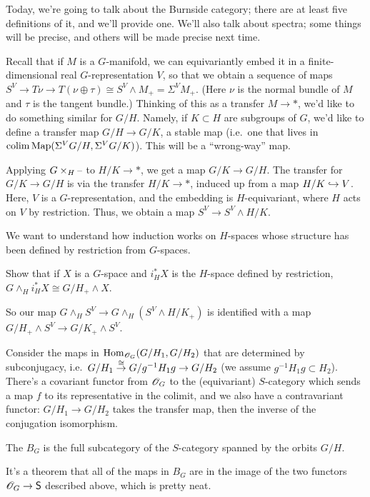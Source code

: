 Today, we're going to talk about the Burnside category; there are at least five definitions of it, and we'll
provide one. We'll also talk about spectra; some things will be precise, and others will be made precise next time.

Recall that if $M$ is a $G$-manifold, we can equivariantly embed it in a finite-dimensional real $G$-representation
$V$, so that we obtain a sequence of maps $S^V\to T\!\nu\to T(\nu\oplus\tau)\cong S^V\wedge M_+ = \Sigma^V M_+$.
(Here $\nu$ is the normal bundle of $M$ and $\tau$ is the tangent bundle.) Thinking of this as a transfer $M\to *$,
we'd like to do something similar for $G/H$. Namely, if $K\subset H$ are subgroups of $G$, we'd like to define a
transfer map $G/H\to G/K$, a stable map (i.e.\ one that lives in $\operatorname*{colim}\operatorname{Map}(\Sigma^V G/H, \Sigma^V G/K)$). This
will be a ``wrong-way'' map.

Applying $G\times_H\text{--}$ to $H/K\to *$, we get a map $G/K\to G/H$. The transfer for $G/K\to G/H$ is via the transfer
$H/K\to *$, induced up from a map $H/K\hookrightarrow V$. Here, $V$ is a $G$-representation, and the embedding is
$H$-equivariant, where $H$ acts on $V$ by restriction. Thus, we obtain a map $S^V\to S^V\wedge H/K$.

We want to understand how induction works on $H$-spaces whose structure has been defined by restriction from
$G$-spaces.
\begin{ex}
Show that if $X$ is a $G$-space and $i_H^*X$ is the $H$-space defined by restriction, $G\wedge_H i_H^*X\cong
G/H_+\wedge X$.
\end{ex}
So our map $G\wedge_H S^V\to G\wedge_H(S^V\wedge H/K_+)$ is identified with a map $G/H_+\wedge S^V\to G/K_+\wedge
S^V$.

Consider the maps in $\operatorname{Hom}_{\mathscr O_G}(G/H_1, G/H_2)$ that are determined by subconjugacy, i.e.\ $G/H_1\stackrel\cong\to
G/g^{-1}H_1g\to G/H_2$ (we assume $g^{-1}H_1g\subset H_2$). There's a covariant functor from $\mathscr O_G$ to the
(equivariant) $S$-category which sends a map $f$ to its representative in the colimit, and we also have a
contravariant functor: $G/H_1\to G/H_2$ takes the transfer map, then the inverse of the conjugation isomorphism.
\begin{defn}
The  $B_G$ is the full subcategory of the $S$-category spanned by the orbits $G/H$.
\end{defn}
It's a theorem that all of the maps in $B_G$ are in the image of the two functors $\mathscr O_G\to\mathsf S$ described above,
which is pretty neat.

